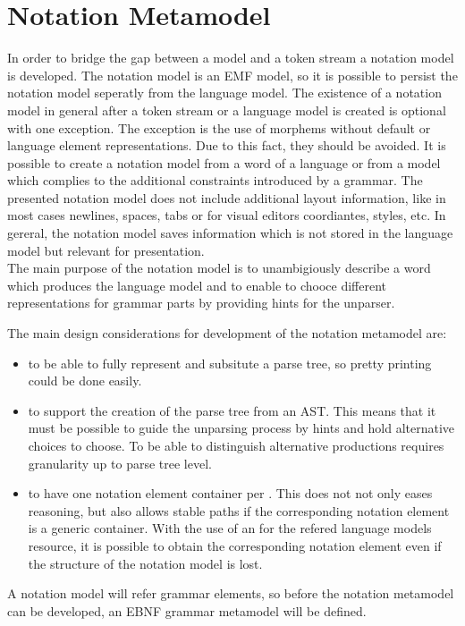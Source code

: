 \chapter{Notation Metamodel}
In order to bridge the gap between a model and a token stream a notation model is developed. The notation model is an EMF model, so it is possible to persist the notation model seperatly from the language model. The existence of a notation model in general after a token stream or a language model is created is optional with one exception. The exception is the use of morphems without default or language element representations. Due to this fact, they should be avoided. It is possible to create a notation model from a word of a language or from a model which complies to the additional constraints introduced by a grammar. The presented notation model does not include additional layout information, like in most cases newlines, spaces, tabs or for visual editors coordiantes, styles, etc. In gereral, the notation model saves information which is not stored in the language model but relevant for presentation.\\

The main purpose of the notation model is to unambigiously describe a word which produces the language model and to enable to chooce different representations for grammar parts by providing hints for the unparser.

The main design considerations for development of the notation metamodel are:
\begin{itemize}
	\item to be able to fully represent and subsitute a parse tree, so pretty printing could be done easily.
	\item to support the creation of the parse tree from an AST. This means that it must be possible to guide the unparsing process by hints and hold alternative choices to choose. To be able to distinguish alternative productions requires granularity up to parse tree level.
	\item to have one notation element container per . This does not not only eases reasoning, but also allows stable paths if the corresponding notation element is a generic container. With the use of an  for the refered language models resource, it is possible to obtain the corresponding notation element even if the structure of the notation model is lost. 
\end{itemize}

A notation model will refer grammar elements, so before the notation metamodel can be developed, an EBNF grammar metamodel will be defined. \\


